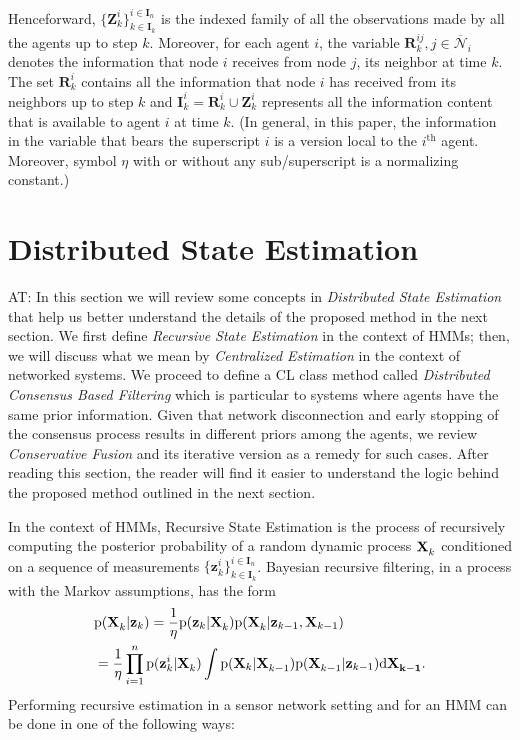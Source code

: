 \documentclass[conference]{IEEEtran}
\newcommand{\vect}[1]{{\mathbf{#1}}}
\theoremstyle{remark}
\newcommand{\axx}[1]{{\color{blue} AT: #1  \ }}  %
\newcommand{\XX}[3][2]{\mathbf{X}_{\tiny #2}^{\tiny #3}}
\newcommand{\pr}{\textrm{p}}
\newcommand{\bIn}{\boldsymbol{I}_{{n}}}
\newcommand{\bIk}{\boldsymbol{I}_{{k}}}
\newcommand{\zz}[3][2]{\mathbf{z}_{ #2}^{ #3}}
\newcommand{\ZZ}[3][2]{\mathbf{Z}_{ #2}^{ #3}}
\begin{document}
Henceforward, $\{\ZZ{k}{i}\}^{i\in\bIn}_{k\in\bIk}$ is the indexed family of all the 
observations made by all the agents up to step $k$. Moreover, for each agent 
$i$, the variable $\vect{R}_{k}^{ij}, j \in \overline{\mathcal{N}}_i $ denotes 
the information that node $i$ receives from node $j$, its neighbor at time 
$k$. The set $\vect{R}_{k}^i$ contains all the information that node $i$ has 
received from its neighbors up to step $k$ and $\vect{I}_{k}^i = \vect{R}_{k}^i 
\cup \vect{Z}_{k}^i$ represents all the information content that is available 
to agent $i$ at time $k$. (In 
general, in this paper, the information in the 
variable that bears the superscript $i$ is a version local to the $i^\text{th}$ 
agent. Moreover, symbol $\eta$ with or without any sub/superscript is a 
normalizing constant.)
\printnomenclature
\section{Distributed State Estimation} \label{subsec:Preliminaries}
\axx{In this section we will review some concepts in \textit{Distributed State 
Estimation} that help us better understand the details of the proposed method 
in 
the next section. We first define \textit{Recursive State Estimation} in the 
context of HMMs; then, we will discuss what we mean by \textit{Centralized 
Estimation} in the context of networked systems. We proceed to define 
a CL class method called \textit{Distributed Consensus Based Filtering} which 
is particular to systems 
where agents have the same prior information. Given that network disconnection 
and early stopping of the consensus process results in different priors among 
the agents, we review \textit{Conservative Fusion} and its iterative version as 
a remedy for such cases. After reading this section, the reader will find it 
easier to understand the logic behind the proposed method outlined in the next 
section. }

In the context of HMMs, Recursive State Estimation is the process of recursively computing the posterior probability of a random dynamic process $\XX[]{k}{}$ conditioned on a sequence of measurements $\{\zz{k}{i}\}^{i\in\bIn}_{k\in\bIk}$. Bayesian recursive filtering, in a process with the Markov assumptions, has the form
\begin{align}
\label{eq:geb}
&\pr(\XX[]{k}{}|\vect{z}_{k})  = \frac{1}{\eta}\pr(\vect{z}_{k}| \XX[]{k}{})\pr(\XX[]{k}{}|\vect{z}_{k-1},\vect{X}_{k-1}) \\
&= \frac{1}{\eta}\prod_{i=1}^{n} \pr(\vect{z}_{k}^i | \XX[]{k}{}) \int \pr(\vect{X}_{k} | \XX[]{k-1}{}) \pr(\XX[]{k-1}{}|\vect{z}_{k-1}) \text{d}\vect{\XX[]{k-1}}.\nonumber 
\end{align}
Performing recursive estimation in a sensor network setting and for an HMM can be done in one of the following ways:
\end{document}
